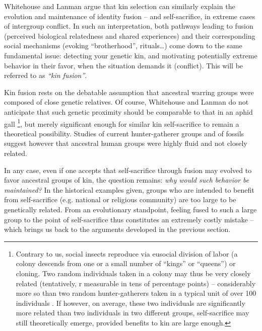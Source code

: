 \documentclass[a4paper,12pt]{report}
\begin{document}
Whitehouse and Lanman \citeyear{whitehouse_ties_2014} argue that kin selection can similarly explain
the evolution and maintenance of identity fusion – and self-sacrifice,
in extreme cases of intergroup conflict. In such an interpretation, 
both pathways leading to fusion (perceived biological relatedness and shared experiences)
and their corresponding social mechanisms (evoking “brotherhood”, rituals…)
come down to the same fundamental issue: detecting your genetic kin, and motivating
potentially extreme behavior in their favor, when the situation demands it (conflict).
This will be referred to as \emph{“kin fusion”}.

Kin fusion rests on the debatable assumption that ancestral warring groups were 
composed of close genetic relatives. Of course, Whitehouse and Lanman do not anticipate
that such genetic proximity should be comparable to that in an aphid gall
\footnote{Contrary to us, social insects reproduce via eusocial division of labor
(a colony descends from one or a small number of “kings” or “queens”) or cloning.
Two random individuals taken in a colony may thus be very closely related (tentatively,
r measurable in tens of percentage points) – considerably more so than
two random hunter-gatherers taken in a typical unit of over 100 individuals \cite{dunbar_grooming_1996}.
If however, on average, these two individuals are significantly more related than
two individuals in two different groups, self-sacrifice may still theoretically emerge,
provided benefits to kin are large enough.},
but merely significant enough for similar kin self-sacrifice to remain a theoretical
possibility. Studies of current hunter-gatherer groups \cite{hill_co-residence_2011} and of fossils
\cite{sikora_ancient_2017} suggest however that ancestral human groups were highly fluid and not
closely related.

In any case, even if one accepts that self-sacrifice through fusion may evolved
to favor ancestral groups of kin, the question remains: \emph{why would such behavior be
maintained?} In the historical examples given, groups who are intended to benefit
from self-sacrifice (e.g. national or religious community) are too large to be
genetically related. From an evolutionary standpoint, feeling fused to such a large group
to the point of self-sacrifice thus constitutes an extremely costly mistake –
which brings us back to the arguments developed in the previous section.

\end{document}

